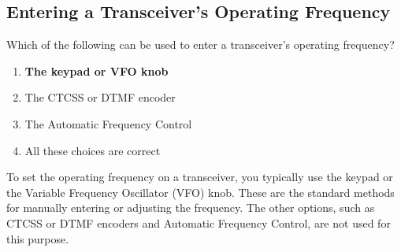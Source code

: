 \subsection{Entering a Transceiver’s Operating Frequency}
\label{T4B02}

\begin{tcolorbox}[colback=gray!10!white,colframe=black!75!black,title=T4B02]
Which of the following can be used to enter a transceiver’s operating frequency?
\begin{enumerate}[noitemsep]
    \item \textbf{The keypad or VFO knob}
    \item The CTCSS or DTMF encoder
    \item The Automatic Frequency Control
    \item All these choices are correct
\end{enumerate}
\end{tcolorbox}

To set the operating frequency on a transceiver, you typically use the keypad or the Variable Frequency Oscillator (VFO) knob. These are the standard methods for manually entering or adjusting the frequency. The other options, such as CTCSS or DTMF encoders and Automatic Frequency Control, are not used for this purpose.